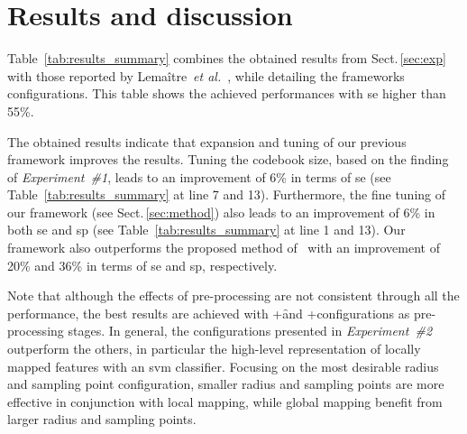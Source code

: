 
\section{Results and discussion}
\label{sec:res-dis}

Table~\ref{tab:results_summary} combines the obtained results from Sect.\,\ref{sec:exp} with those reported by Lema\^{i}tre~\emph{et al.}~\cite{Lemaintre2015miccaiOCT}, while detailing the frameworks configurations.
This table shows the achieved performances with \ac{se} higher than 55\%.

The obtained results indicate that expansion and tuning of our previous framework improves the results.
Tuning the codebook size, based on the finding of \emph{Experiment~\#1}, leads to an improvement of 6\% in terms of \ac{se} (see Table~\ref{tab:results_summary} at line 7 and 13).
Furthermore, the fine tuning of our framework (see Sect.\,\ref{sec:method}) also leads to an improvement of 6\% in both \ac{se} and \ac{sp} (see Table~\ref{tab:results_summary} at line 1 and 13).
Our framework also outperforms the proposed method of~\cite{Venhuizen2015} with an improvement of 20\% and 36\% in terms of \ac{se} and \ac{sp}, respectively.

Note that although the effects of pre-processing are not consistent through all the performance, the best results are achieved with \nlm+\f and \nlm+\fal configurations as pre-processing stages.
In general, the configurations presented in \emph{Experiment~\#2} outperform the others, in particular the high-level representation of locally mapped features with an \ac{svm} classifier.  
Focusing on the most desirable radius and sampling point configuration, smaller radius and sampling points are more effective in conjunction with local mapping, while global mapping benefit from larger radius and sampling points.




